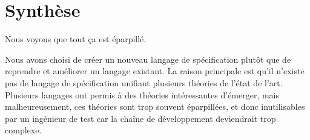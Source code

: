 \section{Synthèse}

Nous voyons que tout ça est éparpillé.

Nous avons choisi de créer un nouveau langage de spécification plutôt que de
reprendre et améliorer un langage existant.
La raison principale est qu'il n'existe pas de langage de spécification unifiant
plusieurs théories de l'état de l'art. Plusieurs langages ont permis à des
théories intéressantes d'émerger, mais malheureusement, ces théories sont
trop souvent éparpillées, et donc inutilisables par un ingénieur de test car la
chaîne de développement deviendrait trop complexe.


